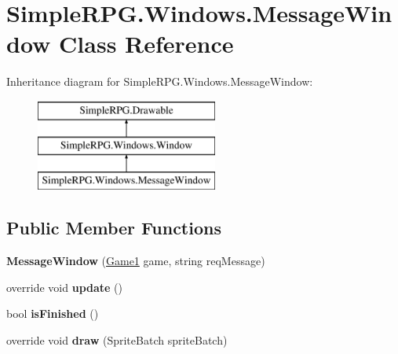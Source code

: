 \hypertarget{class_simple_r_p_g_1_1_windows_1_1_message_window}{\section{Simple\-R\-P\-G.\-Windows.\-Message\-Window Class Reference}
\label{class_simple_r_p_g_1_1_windows_1_1_message_window}
}
Inheritance diagram for Simple\-R\-P\-G.\-Windows.\-Message\-Window\-:\begin{figure}[H]
\begin{center}
\leavevmode
\includegraphics[height=3.000000cm]{class_simple_r_p_g_1_1_windows_1_1_message_window}
\end{center}
\end{figure}
\subsection*{Public Member Functions}
\begin{DoxyCompactItemize}
\item 
\hypertarget{class_simple_r_p_g_1_1_windows_1_1_message_window_aa0d4dc6a22265a7cc941da3891c7e7b3}{{\bfseries Message\-Window} (\hyperlink{class_simple_r_p_g_1_1_game1}{Game1} game, string req\-Message)}\label{class_simple_r_p_g_1_1_windows_1_1_message_window_aa0d4dc6a22265a7cc941da3891c7e7b3}

\item 
\hypertarget{class_simple_r_p_g_1_1_windows_1_1_message_window_aa695ec14b2b596a465dc7b5c9019298a}{override void {\bfseries update} ()}\label{class_simple_r_p_g_1_1_windows_1_1_message_window_aa695ec14b2b596a465dc7b5c9019298a}

\item 
\hypertarget{class_simple_r_p_g_1_1_windows_1_1_message_window_a1ad20623ea7ad20479a064f6b125a90b}{bool {\bfseries is\-Finished} ()}\label{class_simple_r_p_g_1_1_windows_1_1_message_window_a1ad20623ea7ad20479a064f6b125a90b}

\item 
\hypertarget{class_simple_r_p_g_1_1_windows_1_1_message_window_ad84de4bd052fa5fdede8cdb5c749dd9f}{override void {\bfseries draw} (Sprite\-Batch sprite\-Batch)}\label{class_simple_r_p_g_1_1_windows_1_1_message_window_ad84de4bd052fa5fdede8cdb5c749dd9f}

\end{DoxyCompactItemize}
